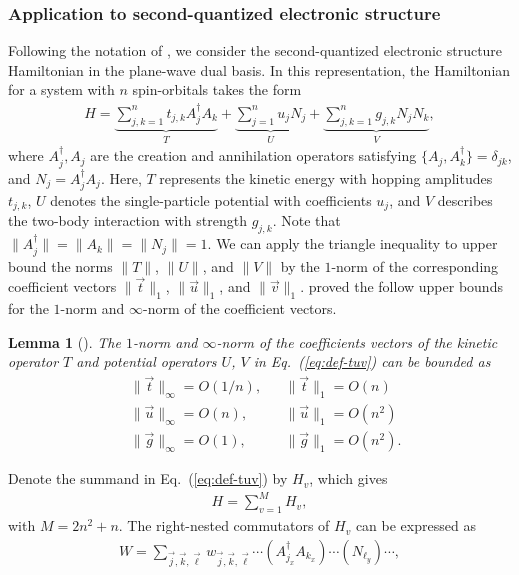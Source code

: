 \documentclass[aps,pra,reprint,groupedaddress,floatfix]{revtex4-2}
\newtheorem{lemma}{Lemma}
\newcommand{\eq}[1]{(\ref{eq:#1})}
\begin{document}
\subsubsection{Application to second-quantized electronic structure}
Following the notation of \citet{childs2021theory}, we consider the second-quantized electronic structure Hamiltonian in the plane-wave dual basis. In this representation, the Hamiltonian for a system with $n$ spin-orbitals takes the form
\begin{align}
    \label{eq:def-tuv}
    H = \underbrace{\sum_{j,k=1}^n t_{j,k} A_j^\dagger A_k}_{T} 
      + \underbrace{\sum_{j=1}^n u_j N_j}_{U} 
      + \underbrace{\sum_{j,k=1}^n g_{j,k} N_j N_k}_{V},
\end{align}
where $A_j^\dagger, A_j$ are the creation and annihilation operators satisfying $\{A_j, A_k^\dagger\} = \delta_{jk}$, and $N_j = A_j^\dagger A_j$. Here, $T$ represents the kinetic energy with hopping amplitudes $t_{j,k}$, $U$ denotes the single-particle potential with coefficients $u_j$, and $V$ describes the two-body interaction with strength $g_{j,k}$.
Note that $\|A_j^{\dagger}\|=\|A_k\|=\|N_j\|=1$. We can apply the triangle inequality to upper bound the norms $\|T\|$, $\|U\|$, and $\|V\|$ by the $1$-norm of the corresponding coefficient vectors $\|\vec{t}\|_1$, $\|\vec{u}\|_1$, and $\|\vec{v}\|_1$. \citet{childs2021theory} proved the follow upper bounds for the $1$-norm and $\infty$-norm of the coefficient vectors. 
\begin{lemma}[{\cite[Proposition F.2]{childs2021theory}}]
\label{lem:norm-tuv}
    The $1$-norm and $\infty$-norm of the coefficients vectors of the kinetic operator $T$ and potential operators $U$, $V$ in Eq.~\eq{def-tuv} can be bounded as \begin{align*}
        &\|\vec{t}\|_{\infty} = O(1/n), && \|\vec{t}\|_1 = O(n) \\
        &\|\vec{u}\|_{\infty} = O(n), && \|\vec{u}\|_1 = O(n^2) \\
        &\|\vec{g}\|_{\infty} = O(1), && \|\vec{g}\|_1  = O(n^2). 
    \end{align*}
\end{lemma}
Denote the summand in Eq.~\eq{def-tuv} by $H_{v}$, which gives \begin{align*}
    H = \sum_{v = 1}^{M} H_{v},
\end{align*}
with $M = 2n^2 +n$.
The right-nested commutators of $H_v$ can be expressed as \begin{align*}
    W = \sum_{\vec{j}, \vec{k},\vec{\ell}}w_{\vec{j}, \vec{k},\vec{\ell}}\cdots (A_{j_x}^{\dagger} A_{k_x}) \cdots (N_{\ell_y})\cdots,
\end{align*}
\end{document}
